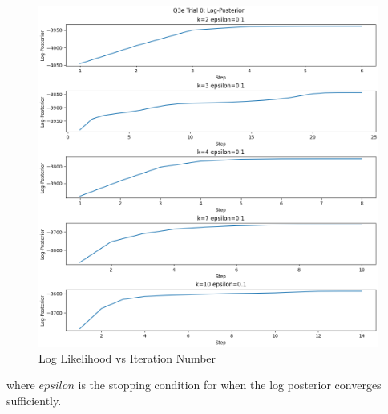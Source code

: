 \documentclass[12pt]{article}
\begin{document}
\begin{enumerate}
\begin{figure}[h]
\centering
\includegraphics[scale=0.35]{outputs/q3/q3e-0-log-pos}
\caption{Log Likelihood vs Iteration Number}
\label{fig:3d-log-like}
\end{figure}

where $epsilon$ is the stopping condition for when the log posterior converges sufficiently.

\newpage


\end{enumerate}
\end{document}
